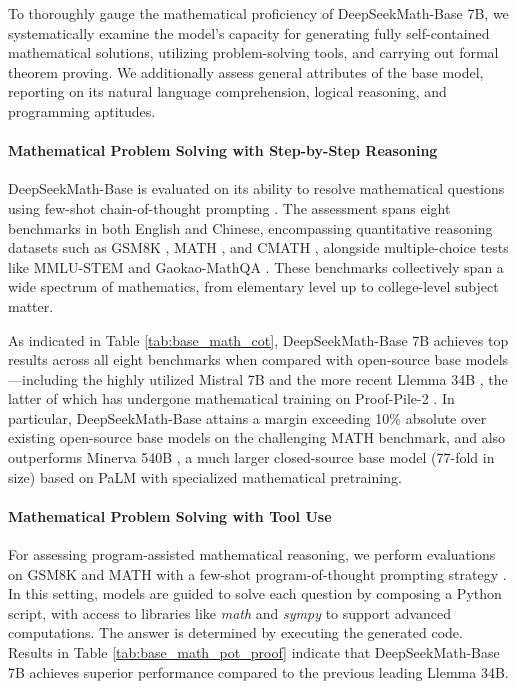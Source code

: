 To thoroughly gauge the mathematical proficiency of DeepSeekMath-Base 7B, we systematically examine the model’s capacity for generating fully self-contained mathematical solutions, utilizing problem-solving tools, and carrying out formal theorem proving. We additionally assess general attributes of the base model, reporting on its natural language comprehension, logical reasoning, and programming aptitudes.

\paragraph{Mathematical Problem Solving with Step-by-Step Reasoning}

DeepSeekMath-Base is evaluated on its ability to resolve mathematical questions using few-shot chain-of-thought prompting \citep{cot}. The assessment spans eight benchmarks in both English and Chinese, encompassing quantitative reasoning datasets such as GSM8K \citep{gsm8k}, MATH \citep{MATH}, and CMATH \citep{wei2023cmath}, alongside multiple-choice tests like MMLU-STEM \citep{mmlu} and Gaokao-MathQA \citep{agieval}. These benchmarks collectively span a wide spectrum of mathematics, from elementary level up to college-level subject matter.

As indicated in Table \ref{tab:base_math_cot}, DeepSeekMath-Base 7B achieves top results across all eight benchmarks when compared with open-source base models—including the highly utilized Mistral 7B \citep{mistral} and the more recent Llemma 34B \citep{llemma}, the latter of which has undergone mathematical training on Proof-Pile-2 \citep{llemma}. In particular, DeepSeekMath-Base attains a margin exceeding 10\% absolute over existing open-source base models on the challenging MATH benchmark, and also outperforms Minerva 540B \citep{minerva}, a much larger closed-source base model (77-fold in size) based on PaLM \citep{palm} with specialized mathematical pretraining.

\paragraph{Mathematical Problem Solving with Tool Use} For assessing program-assisted mathematical reasoning, we perform evaluations on GSM8K and MATH with a few-shot program-of-thought prompting strategy \citep{pot,pal}. In this setting, models are guided to solve each question by composing a Python script, with access to libraries like \textit{math} and \textit{sympy} to support advanced computations. The answer is determined by executing the generated code. Results in Table \ref{tab:base_math_pot_proof} indicate that DeepSeekMath-Base 7B achieves superior performance compared to the previous leading Llemma 34B.

